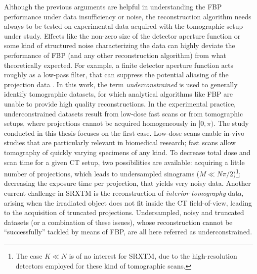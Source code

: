 {Although the previous arguments are helpful in understanding the FBP performance under data insufficiency or noise,
the reconstruction algorithm needs always to be tested on experimental data acquired with the tomographic setup under study.
Effects like the non-zero size of the detector aperture function 
or some kind of structured noise characterizing the data can highly deviate the performance
of FBP (and any other reconstruction algorithm) from what theoretically expected. For example, a finite detector aperture function
acts roughly as a low-pass filter, that can suppress the potential aliasing of the projection data \cite{Kak2001}.
\newline
In this work, the term \emph{underconstrained} is used to generally identify tomographic datasets, for which
analytical algorithms like FBP are unable to provide high quality reconstructions. 
In the experimental practice, underconstrained datasets result from
low-dose fast scans or from tomographic setups, where projections cannot be acquired homogeneously in $[0,\pi)$.
The study conducted in this thesis focuses on the first case. Low-dose scans enable in-vivo studies that are
particularly relevant in biomedical research; fast scans allow tomography of quickly varying specimens of any kind.
To decrease total dose and scan time for a given CT setup, two possibilities are available:
acquiring a little number of projections, which leads to undersampled sinograms ($M \ll N \pi / 2$)\footnote{The case
$K \ll N$ is of no interest for SRXTM, due to the high-resolution detectors employed for these kind of tomographic scans.}; 
decreasing the exposure time per projection, that yields very noisy data.
Another current challenge in SRXTM is the reconstruction of \emph{interior tomography} data, arising when the irradiated 
object does not fit inside the CT field-of-view, leading to the acquisition of truncated projections.
Undersampled, noisy and truncated datasets (or a combination of these issues), whose reconstruction cannot be ``successfully''
tackled by means of FBP, are all here referred as underconstrained.


}
